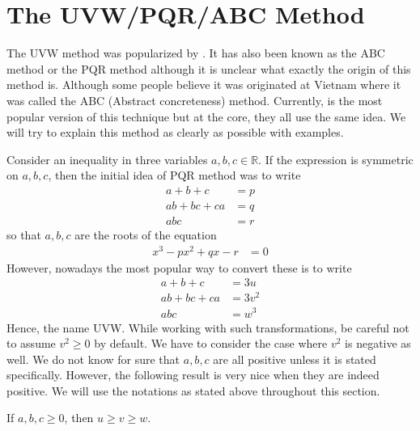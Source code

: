 \documentclass{subfile}
\begin{document}
	\section{The UVW/PQR/ABC Method}\label{sec:uvw}
	The UVW method was popularized by \textcite{rozenberg_2011}. It has also been known as the ABC method or the PQR method although it is unclear what exactly the origin of this method is. Although some people believe it was originated at Vietnam where it was called the ABC (Abstract concreteness) method. Currently, \textcite{knudsen} is the most popular version of this technique but at the core, they all use the same idea. We will try to explain this method as clearly as possible with examples.

	Consider an inequality in three variables $a,b,c\in\mathbb{R}$. If the expression is symmetric on $a,b,c$, then the initial idea of PQR method was to write
		\begin{align*}
			a+b+c
				& = p\\
			ab+bc+ca
				& = q\\
			abc
				& = r
		\end{align*}
	so that $a,b,c$ are the roots of the equation
		\begin{align*}
			x^{3}-px^{2}+qx-r
				& = 0
		\end{align*}
	However, nowadays the most popular way to convert these is to write
		\begin{align*}
			a+b+c
				& = 3u\\
			ab+bc+ca
				& = 3v^{2}\\
			abc
				& = w^{3}
		\end{align*}
	Hence, the name UVW. While working with such transformations, be careful not to assume $v^{2}\geq 0$ by default. We have to consider the case where $v^{2}$ is negative as well. We do not know for sure that $a,b,c$ are all positive unless it is stated specifically. However, the following result is very nice when they are indeed positive. We will use the notations as stated above throughout this section.
		\begin{theorem}
			If $a,b,c\geq 0$, then $u\geq v\geq w$.
		\end{theorem}
\end{document}
